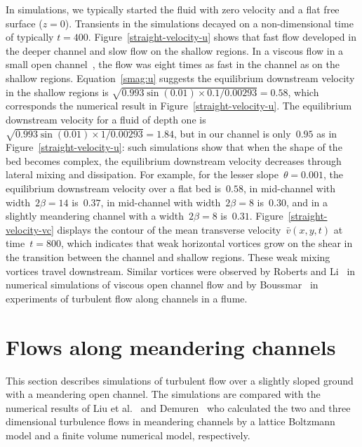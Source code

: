 \documentclass[a5paper,12pt]{article}
\newcommand{\vv}{{\bar v}}
\begin{document}
In simulations, we typically started the fluid with zero velocity and a flat free surface ($z=0$). 
Transients in the simulations decayed on a non-dimensional time of typically $t=400$.
Figure~\ref{straight-velocity-u} shows that fast flow developed in the deeper channel and slow flow on the shallow regions.
In a viscous flow in a small open channel~\cite{Robertsli2006}, the flow was eight times as fast in the channel as on the shallow regions. 
Equation~\eqref{smag:u} suggests the equilibrium downstream velocity in the shallow regions is $\sqrt{0.993\sin(0.01)\times0.1/0.00293}=0.58$, which corresponds the numerical result in Figure~\ref{straight-velocity-u}. 
The equilibrium downstream velocity for a fluid of depth one is $\sqrt{0.993\sin(0.01)\times1/0.00293}=1.84$, but in our channel is only~$0.95$ as in Figure~\ref{straight-velocity-u}: 
such simulations show that when the shape of the bed becomes complex, the equilibrium downstream velocity decreases through lateral mixing and dissipation. 
For example, for the lesser slope~$\theta=0.001$, the equilibrium downstream velocity over a flat bed is~$0.58$, in mid-channel with  width~$2\beta=14$ is~$0.37$, in mid-channel with  width~$2\beta=8$ is~$0.30$, and in a slightly meandering channel with a width~$2\beta=8$ is~$0.31$.
Figure~\ref{straight-velocity-vc} displays the contour of the mean transverse velocity~$\vv(x,y,t)$ at time~$t=800$, which indicates that weak horizontal vortices grow on the shear in the transition between the channel and shallow regions.  
These weak mixing vortices travel downstream. 
Similar vortices were observed by Roberts and Li~\cite{Robertsli2006} in numerical simulations of viscous open channel flow and by Boussmar~\cite{Bousmar2003a} in experiments of turbulent flow along channels in a flume. 








\section{Flows along meandering channels}

This section describes simulations of turbulent flow over a slightly sloped ground with a meandering open channel. 
The simulations are compared with the numerical results of Liu et al.~\cite{Liu2009} and Demuren~\cite{Demuren1993} who calculated the two and three dimensional turbulence flows in meandering channels by a lattice Boltzmann model and a finite volume numerical model, respectively.
\end{document}
